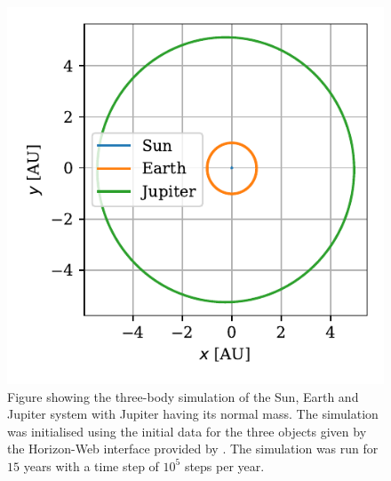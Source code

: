 \documentclass[twocolumn]{aastex62}
\begin{document}
\begin{figure}
\includegraphics[scale=1]{Figures/jupiter.pdf}
\caption{Figure showing the three-body simulation of the Sun, Earth and Jupiter system
with Jupiter having its normal mass. The simulation was initialised using the
initial data for the three objects given by the Horizon-Web interface provided by \cite{nasa:2018}. The simulation
was run for $15$ years with a time step of $10^5$ steps per year.}
\label{fig:jupiter}
\end{figure}
\end{document}
